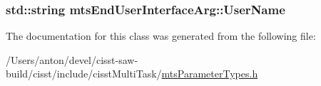 \subsubsection[{User\+Name}]{\setlength{\rightskip}{0pt plus 5cm}std\+::string mts\+End\+User\+Interface\+Arg\+::\+User\+Name}\label{classmts_end_user_interface_arg_a0698eac4ba5458816ef097e6094c1036}


The documentation for this class was generated from the following file\+:\begin{DoxyCompactItemize}
\item 
/\+Users/anton/devel/cisst-\/saw-\/build/cisst/include/cisst\+Multi\+Task/\hyperlink{mts_parameter_types_8h}{mts\+Parameter\+Types.\+h}\end{DoxyCompactItemize}
